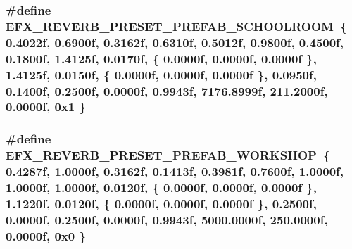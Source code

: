 \subsubsection[{\texorpdfstring{E\+F\+X\+\_\+\+R\+E\+V\+E\+R\+B\+\_\+\+P\+R\+E\+S\+E\+T\+\_\+\+P\+R\+E\+F\+A\+B\+\_\+\+S\+C\+H\+O\+O\+L\+R\+O\+OM}{EFX_REVERB_PRESET_PREFAB_SCHOOLROOM}}]{\setlength{\rightskip}{0pt plus 5cm}\#define E\+F\+X\+\_\+\+R\+E\+V\+E\+R\+B\+\_\+\+P\+R\+E\+S\+E\+T\+\_\+\+P\+R\+E\+F\+A\+B\+\_\+\+S\+C\+H\+O\+O\+L\+R\+O\+OM~\{ 0.\+4022f, 0.\+6900f, 0.\+3162f, 0.\+6310f, 0.\+5012f, 0.\+9800f, 0.\+4500f, 0.\+1800f, 1.\+4125f, 0.\+0170f, \{ 0.\+0000f, 0.\+0000f, 0.\+0000f \}, 1.\+4125f, 0.\+0150f, \{ 0.\+0000f, 0.\+0000f, 0.\+0000f \}, 0.\+0950f, 0.\+1400f, 0.\+2500f, 0.\+0000f, 0.\+9943f, 7176.\+8999f, 211.\+2000f, 0.\+0000f, 0x1 \}}\hypertarget{efx-presets_8h_aec9b167a892e651662053f1a0c2ace4e}{}\label{efx-presets_8h_aec9b167a892e651662053f1a0c2ace4e}
\subsubsection[{\texorpdfstring{E\+F\+X\+\_\+\+R\+E\+V\+E\+R\+B\+\_\+\+P\+R\+E\+S\+E\+T\+\_\+\+P\+R\+E\+F\+A\+B\+\_\+\+W\+O\+R\+K\+S\+H\+OP}{EFX_REVERB_PRESET_PREFAB_WORKSHOP}}]{\setlength{\rightskip}{0pt plus 5cm}\#define E\+F\+X\+\_\+\+R\+E\+V\+E\+R\+B\+\_\+\+P\+R\+E\+S\+E\+T\+\_\+\+P\+R\+E\+F\+A\+B\+\_\+\+W\+O\+R\+K\+S\+H\+OP~\{ 0.\+4287f, 1.\+0000f, 0.\+3162f, 0.\+1413f, 0.\+3981f, 0.\+7600f, 1.\+0000f, 1.\+0000f, 1.\+0000f, 0.\+0120f, \{ 0.\+0000f, 0.\+0000f, 0.\+0000f \}, 1.\+1220f, 0.\+0120f, \{ 0.\+0000f, 0.\+0000f, 0.\+0000f \}, 0.\+2500f, 0.\+0000f, 0.\+2500f, 0.\+0000f, 0.\+9943f, 5000.\+0000f, 250.\+0000f, 0.\+0000f, 0x0 \}}\hypertarget{efx-presets_8h_a6ad70d927e2b4e20cb27fa09c97f1757}{}\label{efx-presets_8h_a6ad70d927e2b4e20cb27fa09c97f1757}
